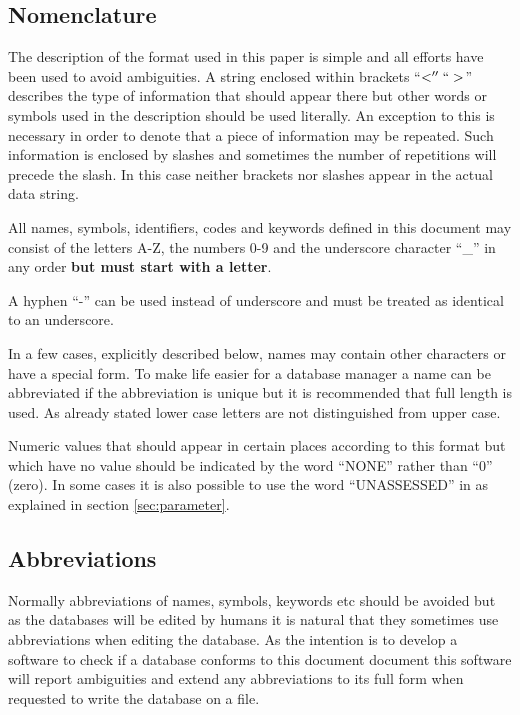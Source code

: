 \documentclass[12pt]{article}
\begin{document}
\subsection{Nomenclature}

The description of the format used in this paper is simple and all
efforts have been used to avoid ambiguities.  A string enclosed within
brackets ``$<'' ``>$'' describes the type of information that should
appear there but other words or symbols used in the description should
be used literally.  An exception to this is necessary in order to
denote that a piece of information may be repeated.  Such information
is enclosed by slashes and sometimes the number of repetitions will
precede the slash.  In this case neither brackets nor slashes appear
in the actual data string.

All names, symbols, identifiers, codes and keywords defined in this
document may consist of the letters A-Z, the numbers 0-9 and the
underscore character ``\_'' in any order {\bf but must start with a
  letter}.  

A hyphen ``-'' can be used instead of underscore and must be treated
as identical to an underscore.

In a few cases, explicitly described below, names may contain other
characters or have a special form.  To make life easier for a database
manager a name can be abbreviated if the abbreviation is unique but it
is recommended that full length is used.  As already stated lower case
letters are not distinguished from upper case.

Numeric values that should appear in certain places according to this
format but which have no value should be indicated by the word
``NONE'' rather than ``0'' (zero).  In some cases it is also possible
to use the word ``UNASSESSED'' in as explained in section
\ref{sec:parameter}.

\subsection{Abbreviations}

Normally abbreviations of names, symbols, keywords etc should be
avoided but as the databases will be edited by humans it is natural
that they sometimes use abbreviations when editing the database.  As
the intention is to develop a software to check if a database conforms
to this document document this software will report ambiguities and
extend any abbreviations to its full form when requested to write the
database on a file.
\end{document}
